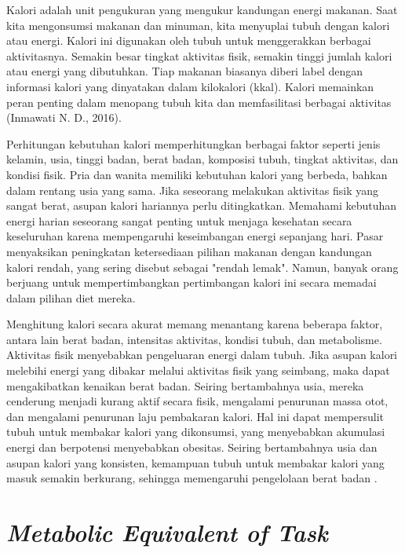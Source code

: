 Kalori adalah unit pengukuran yang mengukur kandungan energi makanan. Saat kita mengonsumsi makanan dan minuman, kita menyuplai tubuh dengan kalori atau energi. Kalori ini digunakan oleh tubuh untuk menggerakkan berbagai aktivitasnya. Semakin besar tingkat aktivitas fisik, semakin tinggi jumlah kalori atau energi yang dibutuhkan. Tiap makanan biasanya diberi label dengan informasi kalori yang dinyatakan dalam kilokalori (kkal). Kalori memainkan peran penting dalam menopang tubuh kita dan memfasilitasi berbagai aktivitas (Inmawati N. D., 2016).

Perhitungan kebutuhan kalori memperhitungkan berbagai faktor seperti jenis kelamin, usia, tinggi badan, berat badan, komposisi tubuh, tingkat aktivitas, dan kondisi fisik. Pria dan wanita memiliki kebutuhan kalori yang berbeda, bahkan dalam rentang usia yang sama. Jika seseorang melakukan aktivitas fisik yang sangat berat, asupan kalori hariannya perlu ditingkatkan. Memahami kebutuhan energi harian seseorang sangat penting untuk menjaga kesehatan secara keseluruhan karena mempengaruhi keseimbangan energi sepanjang hari. Pasar menyaksikan peningkatan ketersediaan pilihan makanan dengan kandungan kalori rendah, yang sering disebut sebagai "rendah lemak". Namun, banyak orang berjuang untuk mempertimbangkan pertimbangan kalori ini secara memadai dalam pilihan diet mereka.

Menghitung kalori secara akurat memang menantang karena beberapa faktor, antara lain berat badan, intensitas aktivitas, kondisi tubuh, dan metabolisme. Aktivitas fisik menyebabkan pengeluaran energi dalam tubuh. Jika asupan kalori melebihi energi yang dibakar melalui aktivitas fisik yang seimbang, maka dapat mengakibatkan kenaikan berat badan. Seiring bertambahnya usia, mereka cenderung menjadi kurang aktif secara fisik, mengalami penurunan massa otot, dan mengalami penurunan laju pembakaran kalori. Hal ini dapat mempersulit tubuh untuk membakar kalori yang dikonsumsi, yang menyebabkan akumulasi energi dan berpotensi menyebabkan obesitas. Seiring bertambahnya usia dan asupan kalori yang konsisten, kemampuan tubuh untuk membakar kalori yang masuk semakin berkurang, sehingga memengaruhi pengelolaan berat badan \parencite{Widiantini}.

\section{\emph{Metabolic Equivalent of Task}}
\label{sec:met}

